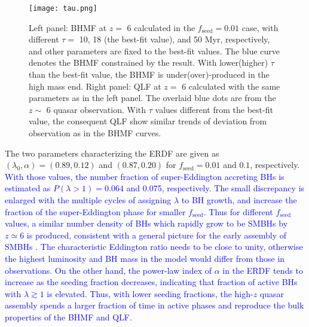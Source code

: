 \documentclass[twocolumn, twocolappendix]{aastex63}
\newcommand{\tlife}{\tau}
\newcommand{\fseed}{f_\mathrm{seed}}
\newcommand{\blue}[1]{\textcolor{blue}{ #1}}
\begin{document}
\begin{CJK*}{UTF8}{gbsn}
\begin{figure*}
\centering
\texttt{[image: tau.png]}
\caption{
Left panel: BHMF at $z=$ 6 calculated in the $\fseed=0.01$ case, 
with different $\tlife=$ 10, 18 (the best-fit value), and 50 Myr, respectively, 
and other parameters are fixed to the best-fit values. 
The blue curve denotes the BHMF constrained by the  result. 
With lower(higher) $\tlife$ than the best-fit value, the BHMF is under(over)-produced in the high mass end.
Right panel: QLF at $z=$ 6 calculated with the same parameters as in the left panel.
The overlaid blue dots are from the  $z\sim$ 6 quasar observation. 
With $\tlife$ values different from the best-fit value, the consequent QLF show 
similar trends of deviation from observation as in the BHMF curves.
}
\label{fig:tau}
\end{figure*}


The two parameters characterizing the ERDF are given as
$(\lambda_0,\alpha) = (0.89,0.12)$ and $(0.87,0.20)$ for $\fseed=0.01$ and $0.1$, respectively.
\blue{
With those values, the number fraction of super-Eddington accreting BHs is
estimated as $P(\lambda>1)=0.064$ and 0.075, respectively. 
The small discrepancy is enlarged with the multiple cycles of assigning $\lambda$ to BH growth, 
and increase the fraction of the super-Eddington phase for smaller $\fseed$. 
Thus for different $\fseed$ values, a similar number density of BHs which rapidly grow to be SMBHs by $z\simeq 6$ is produced, 
consistent with a general picture for the early assembly of SMBHs 
\citep[e.g.,][]{2006NewAR..50..665F,2008AJ....135.1057J,2010AJ....139..906W}.
The characteristic Eddington ratio needs to be close to unity, otherwise the highest luminosity and BH mass
in the model would differ from those in observations.
On the other hand, the power-law index of $\alpha$ in the ERDF tends to increase as the seeding fraction decreases,
indicating that fraction of active BHs with $\lambda \gtrsim 1$ is elevated. 
Thus, with lower seeding fractions, the high-$z$ quasar assembly spends a larger fraction of time in active phases 
and reproduce the bulk properties of the BHMF and QLF.
}



\end{CJK*}
\end{document}
